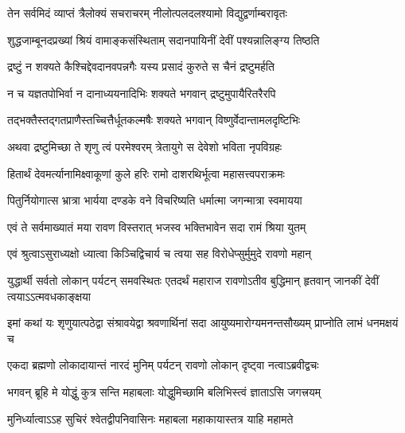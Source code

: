 \twolineshloka
{तेन सर्वमिदं व्याप्तं त्रैलोक्यं सचराचरम्}
{नीलोत्पलदलश्यामो विद्युद्वर्णाम्बरावृतः} %

\twolineshloka
{शुद्धजाम्बूनदप्रख्यां श्रियं वामाङ्कसंस्थिताम्}
{सदानपायिनीं देवीं पश्यन्नालिङ्ग्य तिष्ठति} %

\twolineshloka
{द्रष्टुं न शक्यते कैश्चिद्देवदानवपन्नगैः}
{यस्य प्रसादं कुरुते स चैनं द्रष्टुमर्हति} %

\twolineshloka
{न च यज्ञतपोभिर्वा न दानाध्ययनादिभिः}
{शक्यते भगवान् द्रष्टुमुपायैरितरैरपि} %

\twolineshloka
{तद्भक्तैस्तद्गतप्राणैस्तच्चित्तैर्धूतकल्मषैः}
{शक्यते भगवान् विष्णुर्वेदान्तामलदृष्टिभिः} %

\twolineshloka
{अथवा द्रष्टुमिच्छा ते शृणु त्वं परमेश्वरम्}
{त्रेतायुगे स देवेशो भविता नृपविग्रहः} %

\twolineshloka
{हितार्थं देवमर्त्यानामिक्ष्वाकूणां कुले हरिः}
{रामो दाशरथिर्भूत्वा महासत्त्वपराक्रमः} %

\twolineshloka
{पितुर्नियोगात्स भ्रात्रा भार्यया दण्डके वने}
{विचरिष्यति धर्मात्मा जगन्मात्रा स्वमायया} %

\twolineshloka
{एवं ते सर्वमाख्यातं मया रावण विस्तरात्}
{भजस्व भक्तिभावेन सदा रामं श्रिया युतम्} %


\twolineshloka
{एवं श्रुत्वाऽसुराध्यक्षो ध्यात्वा किञ्चिद्विचार्य च}
{त्वया सह विरोधेप्सुर्मुमुदे रावणो महान्} %

\threelineshloka
{युद्धार्थी सर्वतो लोकान् पर्यटन् समवस्थितः}
{एतदर्थं महाराज रावणोऽतीव बुद्धिमान्}
{हृतवान् जानकीं देवीं त्वयाऽऽत्मवधकाङ्क्षया} %

\fourlineindentedshloka
{इमां कथां यः शृणुयात्पठेद्वा}
{संश्रावयेद्वा श्रवणार्थिनां सदा}
{आयुष्यमारोग्यमनन्तसौख्यम्}
{प्राप्नोति लाभं धनमक्षयं च} %






\twolineshloka
{एकदा ब्रह्मणो लोकादायान्तं नारदं मुनिम्}
{पर्यटन् रावणो लोकान् दृष्ट्वा नत्वाऽब्रवीद्वचः} %

\twolineshloka
{भगवन् ब्रूहि मे योद्धुं कुत्र सन्ति महाबलाः}
{योद्धुमिच्छामि बलिभिस्त्वं ज्ञाताऽसि जगत्त्रयम्} %

\twolineshloka
{मुनिर्ध्यात्वाऽऽह सुचिरं श्वेतद्वीपनिवासिनः}
{महाबला महाकायास्तत्र याहि महामते} %

